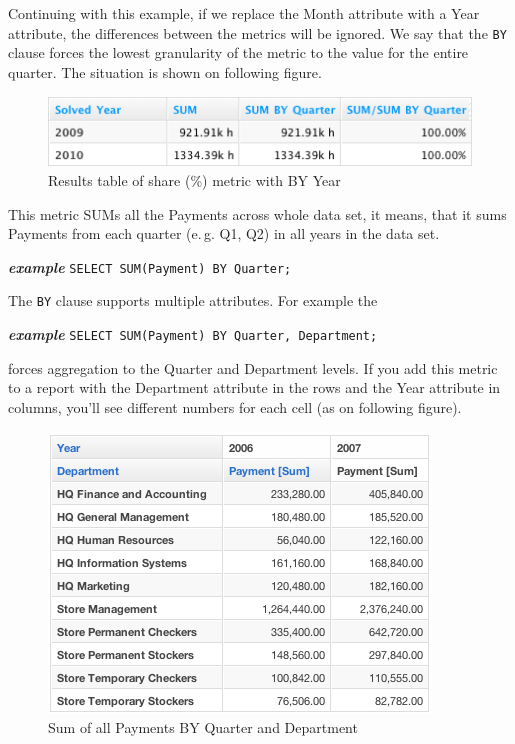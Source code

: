 \documentclass[a4paper, 12pt, titlepage, fleqn]{article}
\begin{document}
Continuing with this example, if we replace the Month attribute with a Year attribute, the differences between the metrics will be ignored.  We say that the \verb=BY= clause forces the lowest granularity of the metric to the value for the entire quarter. The situation is shown on following figure. 

\begin{figure}[htb]
\centering
\includegraphics[scale=0.6]{images/by-ignored.png}
\caption{Results table of share (\%) metric with BY Year}
\label{fig:share_ign}
\end{figure}

This metric SUMs all the Payments across whole data set, it means, that it sums Payments from each quarter (e.\,g. Q1, Q2) in all years in the data set.

\textbf{\emph{example}}  \hspace{.9cm}\verb=SELECT SUM(Payment) BY Quarter;=

\noindent The \verb=BY= clause supports multiple attributes. For example the

\textbf{\emph{example}}  \hspace{.9cm}\verb=SELECT SUM(Payment) BY Quarter, Department;=

\noindent forces aggregation to the Quarter and Department levels. If you add this metric to a report with the Department attribute in the rows and the Year attribute in columns, you'll see different numbers for each cell (as on following figure). 

\begin{figure}[htb]
\centering
\includegraphics[scale=0.6]{images/qDep.png}
\caption{Sum of all Payments BY Quarter and Department}
\label{fig:qDep}
\end{figure}
\end{document}
